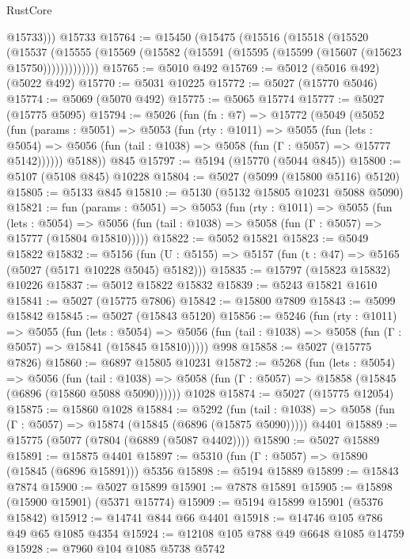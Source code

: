 \begin{lexlean}{RustCore}
\begin{coremodule}
          @15733)))
    @15733
@15764 := @15450
    (@15475
      (@15516
        (@15518
          (@15520
            (@15537
              (@15555 (@15569 (@15582 (@15591 (@15595 (@15599 (@15607 (@15623 @15750)))))))))))))
@15765 := @5010 @492
@15769 := @5012 (@5016 @492) (@5022 @492)
@15770 := @5031 @10225
@15772 := @5027 (@15770 @5046)
@15774 := @5069 (@5070 @492)
@15775 := @5065 @15774
@15777 := @5027 (@15775 @5095)
@15794 := @5026
    (fun (fn : @7) =>
    @15772
      (@5049
        (@5052
          (fun (params : @5051) =>
          @5053
            (fun (rty : @1011) =>
            @5055
              (fun (lets : @5054) =>
              @5056 (fun (tail : @1038) => @5058 (fun (Γ : @5057) => @15777 @5142))))))
        @5188))
    @845
@15797 := @5194 (@15770 (@5044 @845))
@15800 := @5107 (@5108 @845) @10228
@15804 := @5027 (@5099 (@15800 @5116) @5120)
@15805 := @5133 @845
@15810 := @5130 (@5132 @15805 @10231 @5088 @5090)
@15821 := fun (params : @5051) =>
  @5053
    (fun (rty : @1011) =>
    @5055
      (fun (lets : @5054) =>
      @5056 (fun (tail : @1038) => @5058 (fun (Γ : @5057) => @15777 (@15804 @15810)))))
@15822 := @5052 @15821
@15823 := @5049 @15822
@15832 := @5156
    (fun (U : @5155) => @5157 (fun (t : @47) => @5165 (@5027 (@5171 @10228 @5045) @5182)))
@15835 := @15797 (@15823 @15832) @10226
@15837 := @5012 @15822 @15832
@15839 := @5243 @15821 @1610
@15841 := @5027 (@15775 @7806)
@15842 := @15800 @7809
@15843 := @5099 @15842
@15845 := @5027 (@15843 @5120)
@15856 := @5246
    (fun (rty : @1011) =>
    @5055
      (fun (lets : @5054) =>
      @5056 (fun (tail : @1038) => @5058 (fun (Γ : @5057) => @15841 (@15845 @15810)))))
    @998
@15858 := @5027 (@15775 @7826)
@15860 := @6897 @15805 @10231
@15872 := @5268
    (fun (lets : @5054) =>
    @5056
      (fun (tail : @1038) =>
      @5058 (fun (Γ : @5057) => @15858 (@15845 (@6896 (@15860 @5088 @5090))))))
    @1028
@15874 := @5027 (@15775 @12054)
@15875 := @15860 @1028
@15884 := @5292
    (fun (tail : @1038) => @5058 (fun (Γ : @5057) => @15874 (@15845 (@6896 (@15875 @5090)))))
    @4401
@15889 := @15775 (@5077 (@7804 (@6889 (@5087 @4402))))
@15890 := @5027 @15889
@15891 := @15875 @4401
@15897 := @5310 (fun (Γ : @5057) => @15890 (@15845 (@6896 @15891))) @5356
@15898 := @5194 @15889
@15899 := @15843 @7874
@15900 := @5027 @15899
@15901 := @7878 @15891
@15905 := @15898 (@15900 @15901) (@5371 @15774)
@15909 := @5194 @15899 @15901 (@5376 @15842)
@15912 := @14741 @844 @66 @4401
@15918 := @14746 @105 @786 @49 @65 @1085 @4354
@15924 := @12108 @105 @788 @49 @6648 @1085 @14759
@15928 := @7960 @104 @1085 @5738 @5742

\end{coremodule}
\end{lexlean}
